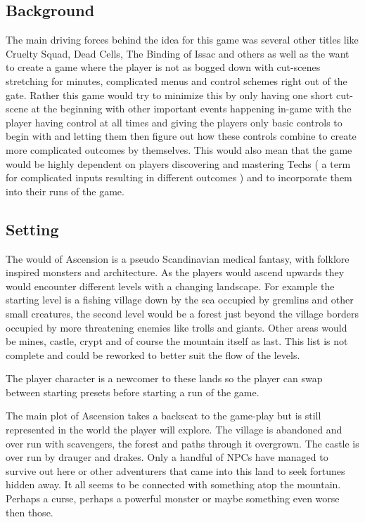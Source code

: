 \documentclass[a4paper,10pt,english]{article}
\begin{document}
\subsection*{Background}
The main driving forces behind the idea for this game was several other titles like Cruelty Squad, Dead Cells, The Binding of Issac and others as well as the want to create a game where the player is not as bogged down with cut-scenes stretching for minutes, complicated menus and control schemes right out of the gate. Rather this game would try to minimize this by only having one short cut-scene at the beginning with other important events happening in-game with the player having control at all times and giving the players only basic controls to begin with and letting them then figure out how these controls combine to create more complicated outcomes by themselves. This would also mean that the game would be highly dependent on players discovering and mastering Techs ( a term for complicated inputs resulting in different outcomes ) and to incorporate them into their runs of the game.

\subsection*{Setting}
The would of Ascension is a pseudo Scandinavian medical fantasy, with folklore inspired monsters and architecture. As the players would ascend upwards they would encounter different levels with a changing landscape. For example the starting level is a fishing village down by the sea occupied by gremlins and other small creatures, the second level would be a forest just beyond the village borders occupied by more threatening enemies like trolls and giants. Other areas would be mines, castle, crypt and of course the mountain itself as last. This list is not complete and could be reworked to better suit the flow of the levels.

The player character is a newcomer to these lands so the player can swap between starting presets before starting a run of the game.

The main plot of Ascension takes a backseat to the game-play but is still represented in the world the player will explore. The village is abandoned and over run with scavengers, the forest and paths through it overgrown. The castle is over run by drauger and drakes. Only a handful of NPCs have managed to survive out here or other adventurers that came into this land to seek fortunes hidden away. It all seems to be connected with something atop the mountain. Perhaps a curse, perhaps a powerful monster or maybe something even worse then those. 
\end{document}
